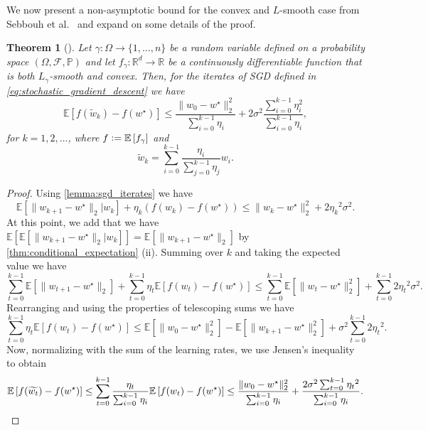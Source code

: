 \documentclass[12pt]{article}
\newtheorem{theorem}{Theorem}[section]
\theoremstyle{definition}
\numberwithin{equation}{section}
\newcommand{\R}{\mathbb{R}}
\newcommand{\E}{\mathbb{E}}
\newcommand{\BP}{\mathbb{P}}
\newcommand{\CF}{\mathcal{F}}
\newcommand{\ev}[1]{\mathbb{E}\left[{#1}\right]}
\newcommand{\norm}[1]{\lVert{#1}\rVert_2}
\newcommand{\defeq}{\vcentcolon=}
\begin{document}
We now present a non-asymptotic bound for the convex and $L$-smooth case from Sebbouh et al.\ \cite{sebbouhAlmostSureConvergence2021} and expand on some details of the proof.
\begin{theorem}[]
  \label{thm:SGD_bound}
  Let $\gamma : \Omega \rightarrow \{1,\dots,n\}$ be a random variable defined on a probability space $(\Omega, \CF, \BP)$ and let $f_{\gamma} : \R^d \rightarrow \R$ be a continuously differentiable function that is both $L_{\gamma}$-smooth and convex. Then, for the iterates of SGD defined in \eqref{eq:stochastic_gradient_descent} we have
  \begin{equation*}
    \ev{f(\widetilde{w}_k) - f(w^\star)} \leq \frac{\norm{w_{0} - w^\star}^2}{\sum_{i=0}^{k-1}\eta_i} + 2 \sigma^2 \frac{\sum_{i=0}^{k-1}\eta_i^2}{\sum_{i=0}^{k-1}\eta_i},
  \end{equation*}
  for $k = 1, 2, \dots$, where $f \defeq \ev{f_\gamma}$ and
  \begin{equation*}
    \widetilde{w}_k = \sum_{i=0}^{k-1}\frac{\eta_i}{\sum_{j=0}^{k-1}\eta_j}w_i.
  \end{equation*}
\end{theorem}
\begin{proof}
  Using \autoref{lemma:sgd_iterates} we have
  \begin{equation*}
    \E[\norm{w_{k+1} - w^\star}|w_k] + \eta_k (f(w_{k}) - f(w^\star)) \leq \norm{w_{k} - w^\star}^2 + 2{\eta_k}^2\sigma^2.
  \end{equation*}
  At this point, we add that we have $\ev{\E[\norm{w_{k+1} - w^\star}|w_k]} = \ev{\norm{w_{k+1} - w^\star}}$ by \autoref{thm:conditional_expectation} (ii).
  Summing over $k$ and taking the expected value we have
  \begin{equation*}
    \sum_{t=0}^{k-1}\ev{\norm{w_{t+1} - w^\star}} + \sum_{t=0}^{k-1} \eta_t \ev{f(w_{t}) - f(w^\star)} \leq \sum_{t=0}^{k-1} \ev{\norm{w_{t} - w^\star}^2} + \sum_{t=0}^{k-1} 2{\eta_t}^2\sigma^2.
  \end{equation*}
  Rearranging and using the properties of telescoping sums we have
  \begin{equation*}
    \sum_{t=0}^{k-1} \eta_t \ev{f(w_{t}) - f(w^\star)} \leq \ev{\norm{w_{0} - w^\star}^2} - \ev{\norm{w_{k+1} - w^\star}^2} + \sigma^2\sum_{t=0}^{k-1} 2{\eta_t}^2.
  \end{equation*}
  Now, normalizing with the sum of the learning rates, we use Jensen's inequality to obtain
  \begin{equation*}
    \ev{f(\widetilde{w_{t}}) - f(w^\star)} \leq \sum_{t=0}^{k-1} \frac{\eta_t}{\sum_{i=0}^{k-1}\eta_i} \ev{f(w_{t}) - f(w^\star)} \leq \frac{\norm{w_{0} - w^\star}^2}{\sum_{i=0}^{k-1}\eta_i} + \frac{2\sigma^2\sum_{t=0}^{k-1} {\eta_t}^2}{\sum_{i=0}^{k-1}\eta_i}. \qedhere
  \end{equation*}
\end{proof}
\end{document}

